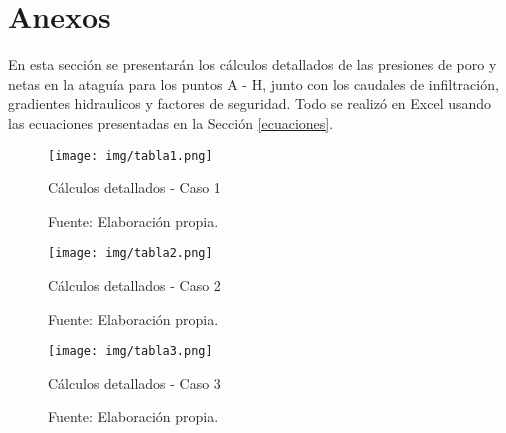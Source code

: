 \documentclass{article} %
\begin{document}
\section{Anexos} \label{anexos}

En esta sección se presentarán los cálculos detallados de las presiones de poro y netas en la ataguía para los puntos A - H, junto con los caudales de infiltración, gradientes hidraulicos y factores de seguridad. Todo se realizó en Excel usando las ecuaciones presentadas en la Sección \ref{ecuaciones}.

\begin{figure}[h!]
    \centering
    \texttt{[image: img/tabla1.png]}
    \caption{Cálculos detallados - Caso 1}
    \caption*{Fuente: Elaboración propia.}
    \label{fig:tabla1}
\end{figure}

\begin{figure}[h!]
    \centering
    \texttt{[image: img/tabla2.png]}
    \caption{Cálculos detallados - Caso 2}
    \caption*{Fuente: Elaboración propia.}
    \label{fig:tabla2}
\end{figure}

\newpage

\begin{figure}[htbp]
    \centering
    \texttt{[image: img/tabla3.png]}
    \caption{Cálculos detallados - Caso 3}
    \caption*{Fuente: Elaboración propia.}
    \label{fig:tabla3}
\end{figure}
\end{document}
